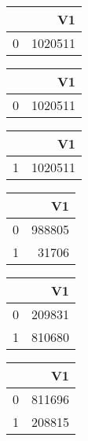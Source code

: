 \bigskip\bigskip
\centering
\begin{tabular}{rr}
  \hline
 & V1 \\ 
  \hline
0 & 1020511 \\ 
   \hline
\end{tabular}

\bigskip\bigskip
\centering
\begin{tabular}{rr}
  \hline
 & V1 \\ 
  \hline
0 & 1020511 \\ 
   \hline
\end{tabular}

\bigskip\bigskip
\centering
\begin{tabular}{rr}
  \hline
 & V1 \\ 
  \hline
1 & 1020511 \\ 
   \hline
\end{tabular}

\bigskip\bigskip
\centering
\begin{tabular}{rr}
  \hline
 & V1 \\ 
  \hline
0 & 988805 \\ 
  1 & 31706 \\ 
   \hline
\end{tabular}

\bigskip\bigskip
\centering
\begin{tabular}{rr}
  \hline
 & V1 \\ 
  \hline
0 & 209831 \\ 
  1 & 810680 \\ 
   \hline
\end{tabular}

\bigskip\bigskip
\centering
\begin{tabular}{rr}
  \hline
 & V1 \\ 
  \hline
0 & 811696 \\ 
  1 & 208815 \\ 
   \hline
\end{tabular}


